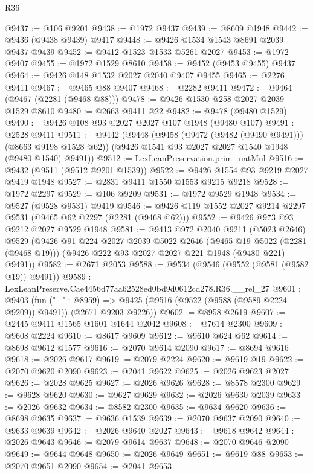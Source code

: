 \begin{lexlean}{R36}
\begin{coremodule}
@9437 := @106 @9201
@9438 := @1972 @9437
@9439 := @8609 @1948
@9442 := @9436 (@9438 @9439) @9417
@9448 := @9426 @1534 @1543 @8691 @2039 @9437 @9439
@9452 := @9412 @1523 @1533 @5261 @2027
@9453 := @1972 @9407
@9455 := @1972 @1529 @8610
@9458 := @9452 (@9453 @9455) @9437
@9464 := @9426 @148 @1532 @2027 @2040 @9407 @9455
@9465 := @2276 @9411
@9467 := @9465 @88 @9407
@9468 := @2282 @9411
@9472 := @9464 (@9467 (@2281 (@9468 @88)))
@9478 := @9426 @1530 @258 @2027 @2039 @1529 @8610
@9480 := @2663 @9411 @22
@9482 := @9478 (@9480 @1529)
@9490 := @9426 @108 @93 @2027 @2027 @107 @1948 (@9480 @107)
@9491 := @2528 @9411
@9511 := @9442
    (@9448
      (@9458 (@9472 (@9482 (@9490 @9491))) (@8663 @9198 @1528 @62))
      (@9426 @1541 @93 @2027 @2027 @1540 @1948 (@9480 @1540) @9491))
@9512 := LexLeanPreservation.prim_natMul
@9516 := @9432 (@9511 (@9512 @9201 @1539))
@9522 := @9426 @1554 @93 @9219 @2027 @9419 @1948
@9527 := @2831 @9411 @1550 @1553 @9215 @9218
@9528 := @1972 @2297
@9529 := @106 @9209
@9531 := @1972 @9529 @1948
@9534 := @9527 (@9528 @9531) @9419
@9546 := @9426 @119 @1552 @2027 @9214 @2297 @9531 (@9465 @62 @2297 (@2281 (@9468 @62)))
@9552 := @9426 @973 @93 @9212 @2027 @9529 @1948
@9581 := @9413
    @972
    @2040
    @9211
    (@5023 @2646)
    @9529
    (@9426
      @91
      @224
      @2027
      @2039
      @5022
      @2646
      (@9465 @19 @5022 (@2281 (@9468 @19)))
      (@9426 @222 @93 @2027 @2027 @221 @1948 (@9480 @221) @9491))
@9582 := @2671 @2053
@9588 := @9534 (@9546 (@9552 (@9581 (@9582 @19)) @9491))
@9589 := LexLeanPreserve.Cae4456d77aa62528ed0bd9d0612cd278.R36.__rel_27
@9601 := @9403
    (fun ("_" : @8959) =>
    @9425 (@9516 (@9522 (@9588 (@9589 @2224 @9209)) @9491)) (@2671 @9203 @9226))
@9602 := @8958 @2619
@9607 := @2445 @9411 @1565 @1601 @1644 @2042
@9608 := @7614 @2300
@9609 := @9608 @2224
@9610 := @8617 @9609
@9612 := @9610 @624 @62
@9614 := @8698 @9612 @1577
@9616 := @2070 @9614 @2090
@9617 := @8694 @9616
@9618 := @2026 @9617
@9619 := @2079 @2224
@9620 := @9619 @19
@9622 := @2070 @9620 @2090
@9623 := @2041 @9622
@9625 := @2026 @9623 @2027
@9626 := @2028 @9625
@9627 := @2026 @9626
@9628 := @8578 @2300
@9629 := @9628 @9620
@9630 := @9627 @9629
@9632 := @2026 @9630 @2039
@9633 := @2026 @9632
@9634 := @8582 @2300
@9635 := @9634 @9620
@9636 := @8698 @9635
@9637 := @9636 @1539
@9639 := @2070 @9637 @2090
@9640 := @9633 @9639
@9642 := @2026 @9640 @2027
@9643 := @9618 @9642
@9644 := @2026 @9643
@9646 := @2079 @9614 @9637
@9648 := @2070 @9646 @2090
@9649 := @9644 @9648
@9650 := @2026 @9649
@9651 := @9619 @88
@9653 := @2070 @9651 @2090
@9654 := @2041 @9653

\end{coremodule}
\end{lexlean}
